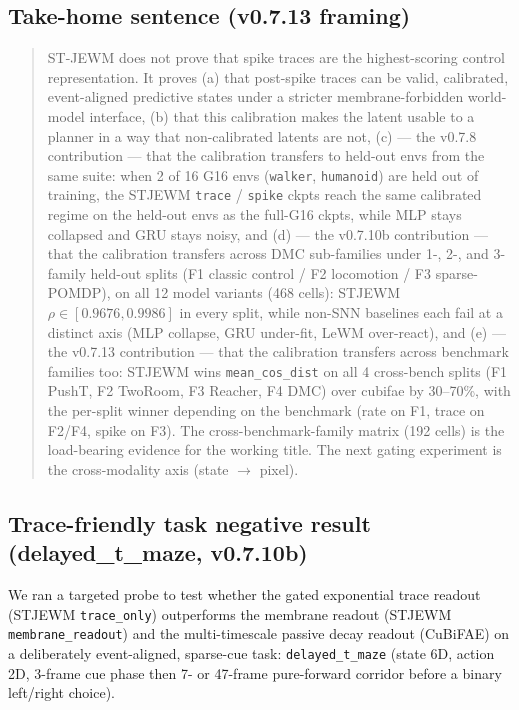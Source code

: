 \documentclass{article}
\begin{document}
\subsection{Take-home sentence (v0.7.13 framing)}

\begin{quote}
ST-JEWM does not prove that spike traces are the highest-scoring
control representation. It proves (a) that post-spike traces can be
valid, calibrated, event-aligned predictive states under a stricter
membrane-forbidden world-model interface, (b) that this calibration
makes the latent usable to a planner in a way that non-calibrated
latents are not, (c) --- the v0.7.8 contribution --- that the
calibration transfers to held-out envs from the same suite: when
2 of 16 G16 envs (\texttt{walker}, \texttt{humanoid}) are held out of training,
the STJEWM \texttt{trace} / \texttt{spike} ckpts reach the same calibrated regime
on the held-out envs as the full-G16 ckpts, while MLP stays
collapsed and GRU stays noisy, and (d) --- the v0.7.10b contribution ---
that the calibration transfers across DMC sub-families under 1-, 2-,
and 3-family held-out splits (F1 classic control / F2 locomotion /
F3 sparse-POMDP), on all 12 model variants (468 cells): STJEWM
$\rho \in [0.9676, 0.9986]$ in every split, while non-SNN baselines
each fail at a distinct axis (MLP collapse, GRU under-fit, LeWM
over-react), and (e) --- the v0.7.13 contribution --- that the
calibration transfers across benchmark families too: STJEWM wins
\texttt{mean\_cos\_dist} on all 4 cross-bench splits (F1 PushT, F2 TwoRoom,
F3 Reacher, F4 DMC) over cubifae by 30--70\%, with the per-split
winner depending on the benchmark (rate on F1, trace on F2/F4,
spike on F3). The cross-benchmark-family matrix (192 cells) is the
load-bearing evidence for the working title. The next gating
experiment is the cross-modality axis (state $\to$ pixel).
\end{quote}

\subsection{Trace-friendly task negative result (delayed\_t\_maze, v0.7.10b)}

We ran a targeted probe to test whether the gated exponential trace
readout (STJEWM \texttt{trace\_only}) outperforms the membrane readout
(STJEWM \texttt{membrane\_readout}) and the multi-timescale passive decay
readout (CuBiFAE) on a deliberately event-aligned, sparse-cue task:
\texttt{delayed\_t\_maze} (state 6D, action 2D, 3-frame cue phase then 7- or
47-frame pure-forward corridor before a binary left/right choice).
\end{document}
